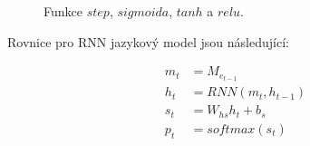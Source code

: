 \begin{figure}[h]
    \begin{center}
    \end{center}
	\caption{Funkce $step$, $sigmoida$, $tanh$ a $relu$.}
	\label{img:functions}
\end{figure}

Rovnice pro RNN jazykový model jsou následující:

\begin{align}
  m_{t}&=M_{e_{t-1}}\label{figure:lastContext} \\
  h_{t}&=RNN(m_t, h_{t-1}) \label{figure:rnnSimple} \\
  s_{t}&=W_{hs}h_t + b_s \label{figure:rnnSt} \\
  p_{t}&=softmax(s_t) \label{figure:rnnSoftmax}
\end{align}


